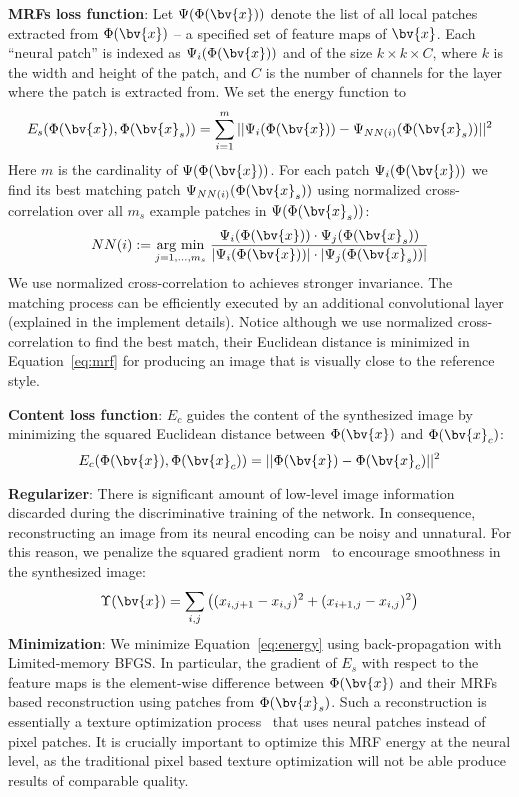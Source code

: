 \documentclass[10pt,twocolumn,letterpaper]{article}
\newcommand{\argmin}[1]{\underset{#1}{\operatorname{arg}\,\operatorname{min}}\;}
\begin{document}
\textbf{MRFs loss function}: Let $\Psi(\Phi(\bv{x}))$ denote the list of all local patches extracted from $\Phi(\bv{x})$ -- a specified set of feature maps of $\bv{x}$. Each ``neural patch'' is indexed as $\Psi_i( \Phi(\bv{x}) )$ and of the size $k \times k \times C$, where $k$ is the width and height of the patch, and $C$ is the number of channels for the layer where the patch is extracted from.
We set the energy function to
\begin{equation}
E_{s}(\Phi(\bv{x}), \Phi(\bv{x}_{s})) = \sum_{i = 1}^{m}||\Psi_i(\Phi(\bv{x})) - \Psi_{NN(i)}(\Phi(\bv{x}_{s}))||^{2}
\label{eq:mrf}
\end{equation}
Here $m$ is the cardinality of $\Psi(\Phi(\bv{x}))$.
For each patch $\Psi_i(\Phi(\bv{x}))$ we find its best matching patch $\Psi_{NN(i)}(\Phi(\bv{x}_{s}))$ using normalized cross-correlation over all $m_s$ example patches in $\Psi(\Phi(\bv{x}_{s}))$: 
\begin{equation}
NN(i) := \argmin{j=1,...,m_s}\frac{\Psi_i(\Phi(\bv{x}))\cdot\Psi_j(\Phi(\bv{x}_{s}))}{|\Psi_i(\Phi(\bv{x}))|\cdot|\Psi_j(\Phi(\bv{x}_{s}))|}
\label{eq:ncorr}
\end{equation}
We use normalized cross-correlation to achieves stronger invariance. The matching process can be efficiently executed by an additional convolutional layer (explained in the implement details). Notice although we use normalized cross-correlation to find the best match, their Euclidean distance is minimized in Equation~\ref{eq:mrf} for producing an image that is visually close to the reference style.  

\textbf{Content loss function}: $E_{c}$ guides the content of the synthesized image by minimizing the squared Euclidean distance between $\Phi(\bv{x})$ and $\Phi(\bv{x}_{c})$:
\begin{equation}
E_{c}(\Phi(\bv{x}), \Phi(\bv{x}_{c})) = ||\Phi(\bv{x}) - \Phi(\bv{x}_{c})||^{2}
\label{eq:content}
\end{equation}

\textbf{Regularizer}: There is significant amount of low-level image information discarded during the discriminative training of the network. In consequence, reconstructing an image from its neural encoding can be noisy and unnatural. For this reason, we penalize the squared gradient norm~\cite{Mahendran15} to encourage smoothness in the synthesized image:
\begin{equation}
\Upsilon(\bv{x}) = \sum_{i, j}\left((x_{i, j + 1} - x_{i, j})^{2} + (x_{i + 1, j} - x_{i, j})^{2}\right)
\label{eq:tv}
\end{equation}
\textbf{Minimization}: We minimize Equation~\ref{eq:energy} using back-propagation with Limited-memory BFGS. In particular, the gradient of $E_{s}$ with respect to the feature maps is the element-wise difference between $\Phi(\bv{x})$ and their MRFs based reconstruction using patches from $\Phi(\bv{x}_{s})$. Such a reconstruction is essentially a texture optimization process~\cite{Kwatra05} that uses neural patches instead of pixel patches. It is crucially important to optimize this MRF energy at the neural level, as the traditional pixel based texture optimization will not be able produce results of comparable quality.
\end{document}
